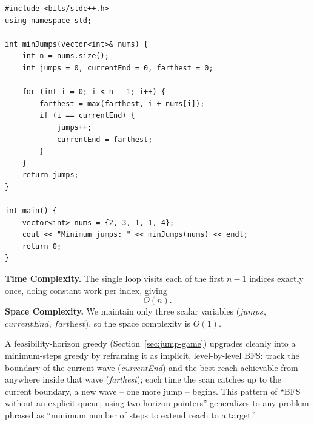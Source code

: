 \begin{lstlisting}
#include <bits/stdc++.h>
using namespace std;

int minJumps(vector<int>& nums) {
    int n = nums.size();
    int jumps = 0, currentEnd = 0, farthest = 0;

    for (int i = 0; i < n - 1; i++) {
        farthest = max(farthest, i + nums[i]);
        if (i == currentEnd) {
            jumps++;
            currentEnd = farthest;
        }
    }
    return jumps;
}

int main() {
    vector<int> nums = {2, 3, 1, 1, 4};
    cout << "Minimum jumps: " << minJumps(nums) << endl;
    return 0;
}
\end{lstlisting}

\begin{complexitybox}
\textbf{Time Complexity.} The single loop visits each of the first $n-1$
indices exactly once, doing constant work per index, giving
\[
  O(n).
\]
\textbf{Space Complexity.} We maintain only three scalar variables
($\textit{jumps}$, $\textit{currentEnd}$, $\textit{farthest}$), so the space
complexity is $O(1)$.
\end{complexitybox}

\begin{takeawaybox}
A feasibility-horizon greedy (Section~\ref{sec:jump-game}) upgrades cleanly
into a minimum-steps greedy by reframing it as implicit, level-by-level BFS:
track the boundary of the current wave (\textit{currentEnd}) and the best
reach achievable from anywhere inside that wave (\textit{farthest}); each
time the scan catches up to the current boundary, a new wave -- one more
jump -- begins. This pattern of ``BFS without an explicit queue, using two
horizon pointers'' generalizes to any problem phrased as ``minimum number of
steps to extend reach to a target.''
\end{takeawaybox}
